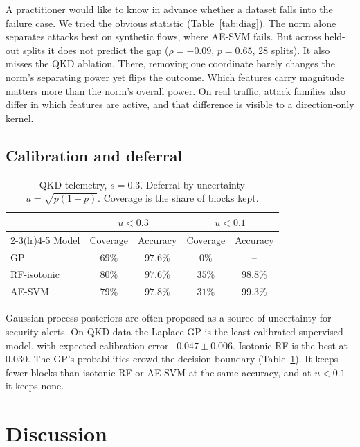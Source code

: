 \documentclass[pdflatex,sn-mathphys-num,lineno]{sn-jnl}
\theoremstyle{thmstyleone}
\begin{document}
A practitioner would like to know in advance whether a dataset falls into the
failure case. We tried the obvious statistic (Table~\ref{tab:diag}). The norm alone
separates attacks best on synthetic flows, where AE-SVM fails. But across held-out
splits it does not predict the gap ($\rho=-0.09$, $p=0.65$, 28 splits). It also misses the QKD ablation.
There, removing one coordinate barely changes the norm's separating power yet flips
the outcome. Which features carry magnitude matters more than the norm's overall
power. On real traffic, attack families also differ in which features are active,
and that difference is visible to a direction-only kernel.

\subsection{Calibration and deferral}

\begin{table}[t]
  \centering
  \caption{QKD telemetry, $s=0.3$. Deferral by uncertainty $u=\sqrt{p(1-p)}$.
  Coverage is the share of blocks kept.}
  \label{tab:select}
  \small
  \begin{tabular}{lcccc}
    \toprule
    & \multicolumn{2}{c}{$u<0.3$} & \multicolumn{2}{c}{$u<0.1$} \\
    \cmidrule(lr){2-3}\cmidrule(lr){4-5}
    Model & Coverage & Accuracy & Coverage & Accuracy \\
    \midrule
    GP & $69\%$ & $97.6\%$ & $0\%$ & -- \\
    RF-isotonic & $80\%$ & $97.6\%$ & $35\%$ & $98.8\%$ \\
    AE-SVM & $79\%$ & $97.8\%$ & $31\%$ & $99.3\%$ \\
    \bottomrule
  \end{tabular}
\end{table}

Gaussian-process posteriors are often proposed as a source of uncertainty for
security alerts. On QKD data the Laplace GP is the least calibrated supervised
model, with expected calibration error~\cite{guo2017calibration} $0.047\pm0.006$.
Isotonic RF is the best at 0.030. The GP's probabilities crowd the decision
boundary (Table~\ref{tab:select}). It keeps fewer blocks than isotonic RF or AE-SVM
at the same accuracy, and at $u<0.1$ it keeps none.

\section{Discussion}
\label{sec:discussion}
\end{document}

